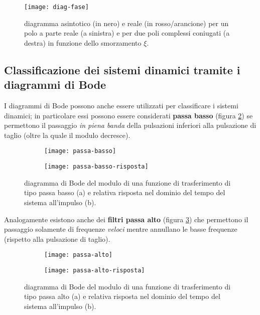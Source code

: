 		\begin{figure}[bht]
			\centering
			\texttt{[image: diag-fase]}
			\caption{diagramma asintotico (in nero) e reale (in rosso/arancione) per un polo a parte reale (a sinistra) e per due poli complessi coniugati (a destra) in funzione dello smorzamento $\xi$.}
			\label{fig:lti:fasebode}
		\end{figure}
	
	\subsection{Classificazione dei sistemi dinamici tramite i diagrammi di Bode}
		I diagrammi di Bode possono anche essere utilizzati per classificare i sistemi dinamici; in particolare essi possono essere considerati \textbf{passa basso} (figura \ref{fig:lti:passabasso}) se permettono il passaggio \textit{in piena banda} della pulsazioni inferiori alla pulsazione di taglio (oltre la quale il modulo decresce).
		
		\begin{figure}[bht]
			\centering
			\begin{subfigure}{0.48\linewidth}
				\centering 
				\texttt{[image: passa-basso]} \caption{}
			\end{subfigure}
			\begin{subfigure}{0.48\linewidth}
				\centering 
				\texttt{[image: passa-basso-risposta]} \caption{}
			\end{subfigure}
			\caption{diagramma di Bode del modulo di una funzione di trasferimento di tipo passa basso (a) e relativa risposta nel dominio del tempo del sistema all'impulso (b).}
			\label{fig:lti:passabasso}
		\end{figure}	
		
		Analogamente esistono anche dei \textbf{filtri passa alto} (figura \ref{fig:lti:passaalto}) che permettono il passaggio solamente di frequenze \textit{veloci} mentre annullano le basse frequenze (rispetto alla pulsazione di taglio).
		
		\begin{figure}[bht]
			\centering
			\begin{subfigure}{0.48\linewidth}
				\centering 
				\texttt{[image: passa-alto]} \caption{}
			\end{subfigure}
			\begin{subfigure}{0.48\linewidth}
				\centering 
				\texttt{[image: passa-alto-risposta]} \caption{}
			\end{subfigure}
			\caption{diagramma di Bode del modulo di una funzione di trasferimento di tipo passa alto (a) e relativa risposta nel dominio del tempo del sistema all'impulso (b).}
			\label{fig:lti:passaalto}
		\end{figure}	
		
